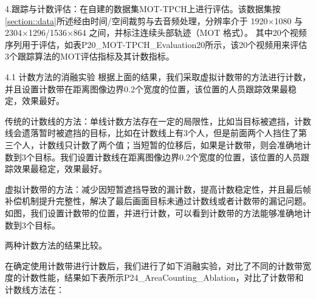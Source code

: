 4.跟踪与计数评估：在自建的数据集MOT-TPCH上进行评估。该数据集按\ref{section::data}所述经由时间/空间裁剪与去音频处理，分辨率介于 1920\(\times\)1080 与 2304\(\times\)1296/1536\(\times\)864 之间，并标注连续头部轨迹（MOT 格式）。
其中20个视频序列用于评估，如表P20_MOT-TPCH_Evaluation20所示，该20个视频用来评估3个跟踪算法的MOT评估指标及其计数指标。

4.1 计数方法的消融实验
根据上面的结果，我们采取虚拟计数带的方法进行计数，并且设置计数带在距离图像边界0.2个宽度的位置，该位置的人员跟踪效果最稳定，效果最好。

传统的计数线的方法：单线计数方法存在一定的局限性，比如当目标被遮挡，计数线会遗落暂时被遮挡的目标，比如在计数线上有3个人，但是前面两个人挡住了第三个人，计数线只计数了两个值；当短暂的位移后，如果是计数带，则会准确地计数到3个目标。我们设置计数线在距离图像边界0.2个宽度的位置，该位置的人员跟踪效果最稳定，效果最好。

虚拟计数带的方法：减少因短暂遮挡导致的漏计数，提高计数稳定性，并且最后帧补偿机制提升完整性，解决了最后画面目标未通过计数线或者计数带的漏记问题。如图，我们设置计数带的位置，并进行计数，可以看到计数带的方法能够准确地计数到3个目标。

两种计数方法的结果比较。

在确定使用计数带进行计数后，我们进行了如下消融实验，对比了不同的计数带宽度的计数性能，结果如下表所示P24_AreaCounting_Ablation，对比了计数带和计数线方法在：


